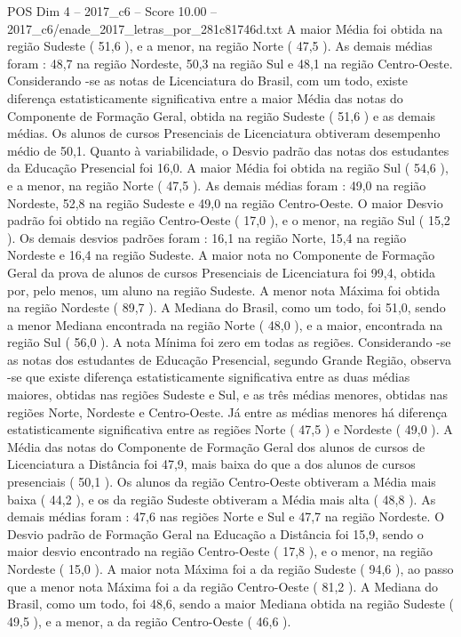 \begin{textsample}{POS Dim 4 – 2017\_c6 – Score 10.00 – 2017\_c6/enade\_2017\_letras\_por\_281c81746d.txt}
A maior Média foi obtida na região Sudeste ( 51,6 ), e a menor, na região Norte ( 47,5 ).
As demais médias foram : 48,7 na região Nordeste, 50,3 na região Sul e 48,1 na região Centro-Oeste.
Considerando -se as notas de Licenciatura do Brasil, com um todo, existe diferença estatisticamente significativa entre a maior Média das notas do Componente de Formação Geral, obtida na região Sudeste ( 51,6 ) e as demais médias.
Os alunos de cursos Presenciais de Licenciatura obtiveram desempenho médio de 50,1.
Quanto à variabilidade, o Desvio padrão das notas dos estudantes da Educação Presencial foi 16,0.
A maior Média foi obtida na região Sul ( 54,6 ), e a menor, na região Norte ( 47,5 ).
As demais médias foram : 49,0 na região Nordeste, 52,8 na região Sudeste e 49,0 na região Centro-Oeste.
O maior Desvio padrão foi obtido na região Centro-Oeste ( 17,0 ), e o menor, na região Sul ( 15,2 ).
Os demais desvios padrões foram : 16,1 na região Norte, 15,4 na região Nordeste e 16,4 na região Sudeste.
A maior nota no Componente de Formação Geral da prova de alunos de cursos Presenciais de Licenciatura foi 99,4, obtida por, pelo menos, um aluno na região Sudeste.
A menor nota Máxima foi obtida na região Nordeste ( 89,7 ).
A Mediana do Brasil, como um todo, foi 51,0, sendo a menor Mediana encontrada na região Norte ( 48,0 ), e a maior, encontrada na região Sul ( 56,0 ).
A nota Mínima foi zero em todas as regiões.
Considerando -se as notas dos estudantes de Educação Presencial, segundo Grande Região, observa -se que existe diferença estatisticamente significativa entre as duas médias maiores, obtidas nas regiões Sudeste e Sul, e as três médias menores, obtidas nas regiões Norte, Nordeste e Centro-Oeste.
Já entre as médias menores há diferença estatisticamente significativa entre as regiões Norte ( 47,5 ) e Nordeste ( 49,0 ).
A Média das notas do Componente de Formação Geral dos alunos de cursos de Licenciatura a Distância foi 47,9, mais baixa do que a dos alunos de cursos presenciais ( 50,1 ).
Os alunos da região Centro-Oeste obtiveram a Média mais baixa ( 44,2 ), e os da região Sudeste obtiveram a Média mais alta ( 48,8 ).
As demais médias foram : 47,6 nas regiões Norte e Sul e 47,7 na região Nordeste.
O Desvio padrão de Formação Geral na Educação a Distância foi 15,9, sendo o maior desvio encontrado na região Centro-Oeste ( 17,8 ), e o menor, na região Nordeste ( 15,0 ).
A maior nota Máxima foi a da região Sudeste ( 94,6 ), ao passo que a menor nota Máxima foi a da região Centro-Oeste ( 81,2 ).
A Mediana do Brasil, como um todo, foi 48,6, sendo a maior Mediana obtida na região Sudeste ( 49,5 ), e a menor, a da região Centro-Oeste ( 46,6 ).

\end{textsample}
